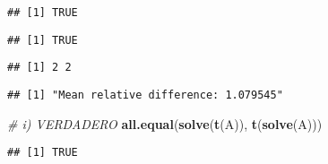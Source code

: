 \documentclass[]{article}
\newenvironment{Shaded}{\begin{snugshade}}{\end{snugshade}}
\newcommand{\CommentTok}[1]{\textcolor[rgb]{0.56,0.35,0.01}{\textit{#1}}}
\newcommand{\KeywordTok}[1]{\textcolor[rgb]{0.13,0.29,0.53}{\textbf{#1}}}
\newcommand{\NormalTok}[1]{#1}
\newcommand{\OperatorTok}[1]{\textcolor[rgb]{0.81,0.36,0.00}{\textbf{#1}}}
\newcommand{\StringTok}[1]{\textcolor[rgb]{0.31,0.60,0.02}{#1}}
\begin{document}
\begin{verbatim}
## [1] TRUE
\end{verbatim}

\begin{Shaded}
\end{Shaded}

\begin{verbatim}
## [1] TRUE
\end{verbatim}

\begin{Shaded}
\end{Shaded}

\begin{verbatim}
## [1] 2 2
\end{verbatim}

\begin{Shaded}
\end{Shaded}

\begin{verbatim}
## [1] "Mean relative difference: 1.079545"
\end{verbatim}

\begin{Shaded}
\begin{Highlighting}[]
\CommentTok{# i) VERDADERO}
\KeywordTok{all.equal}\NormalTok{(}\KeywordTok{solve}\NormalTok{(}\KeywordTok{t}\NormalTok{(A)), }\KeywordTok{t}\NormalTok{(}\KeywordTok{solve}\NormalTok{(A)))}
\end{Highlighting}
\end{Shaded}

\begin{verbatim}
## [1] TRUE
\end{verbatim}
\end{document}
